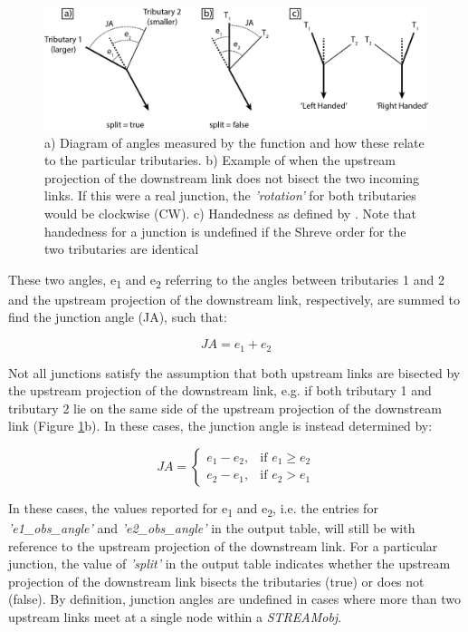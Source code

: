 \begin{figure}[H]
	\centering
	\includegraphics[width=16.5cm]{PNGs/JA_Cartoon.png}
	\caption{ a) Diagram of angles measured by the  function and how these relate to the particular tributaries. b) Example of when the upstream projection of the downstream link does not bisect the two incoming links. If this were a real junction, the \textit{'rotation'} for both tributaries would be clockwise (CW).  c) Handedness as defined by \cite{James1969}. Note that handedness for a junction is undefined if the Shreve order for the two tributaries are identical} 
	\label{fig:JuncAngleCart}
\end{figure}

 These two angles, e\textsubscript{1} and e\textsubscript{2} referring to the angles between tributaries 1 and 2 and the upstream projection of the downstream link, respectively, are summed to find the junction angle (JA), such that:

\begin{equation}
JA = e_{1} + e_{2}
\end{equation}

\noindent Not all junctions satisfy the assumption that both upstream links are bisected by the upstream projection of the downstream link, e.g. if both tributary 1 and tributary 2 lie on the same side of the upstream projection of the downstream link  (Figure \ref{fig:JuncAngleCart}b). In these cases, the junction angle is instead determined by:

\begin{equation}
JA =
\begin{cases}
e_{1} - e_{2},& \text{if } e_{1}\geq e_{2}\\
e_{2} - e_{1},& \text{if } e_{2}> e_{1}
\end{cases}
\end{equation}

\noindent In these cases, the values reported for e\textsubscript{1} and e\textsubscript{2}, i.e. the entries for \textit{'e1\_obs\_angle'} and \textit{'e2\_obs\_angle'} in the output table, will still be with reference to the upstream projection of the downstream link. For a particular junction, the value of \textit{'split'} in the output table indicates whether the upstream projection of the downstream link bisects the tributaries (true) or does not (false). By definition, junction angles are undefined in cases where more than two upstream links meet at a single node within a \textit{STREAMobj}.   

